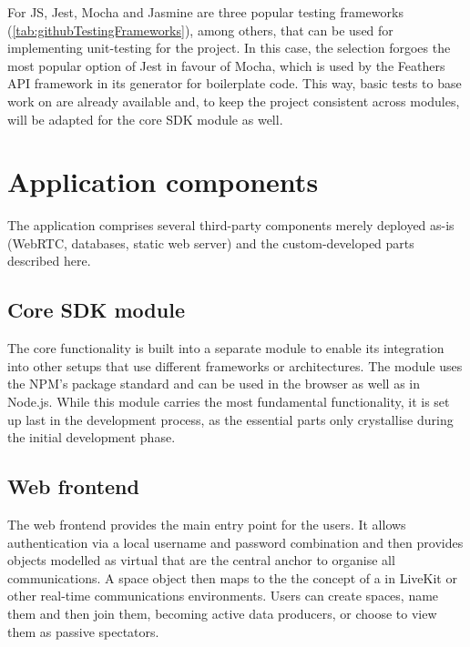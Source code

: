 For \ac{JS}, Jest, Mocha and Jasmine are three popular testing frameworks (\ref{tab:githubTestingFrameworks}), among others, that can be used for implementing unit-testing for the project. In this case, the selection forgoes the most popular option of Jest in favour of Mocha, which is used by the Feathers \ac{API} framework in its generator for boilerplate code. This way, basic tests to base work on are already available and, to keep the project consistent across modules, will be adapted for the core \ac{SDK} module as well.



\section{Application components}

The application comprises several third-party components merely deployed as-is (WebRTC, databases, static web server) and the custom-developed parts described here.

\subsection{Core SDK module}

The core functionality is built into a separate module to enable its integration into other setups that use different frameworks or architectures. The module uses the \ac{NPM}'s package standard and can be used in the browser as well as in Node.js. While this module carries the most fundamental functionality, it is set up last in the development process, as the essential parts only crystallise during the initial development phase.

\subsection{Web frontend}

The web frontend provides the main entry point for the users. It allows authentication via a local username and password combination and then provides objects modelled as virtual  that are the central anchor to organise all communications. A space object then maps to the the concept of a  in LiveKit or other real-time communications environments. Users can create spaces, name them and then join them, becoming active data producers, or choose to view them as passive spectators.

